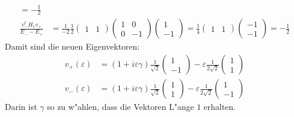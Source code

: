 \begin{loesung}
\begin{align*}
=
-\frac12
\\
\frac{v_-^tH_1v_+}{E_--E_+}
&=
\frac{1}{-2}
\frac12
	\begin{pmatrix}1&1\end{pmatrix}
	\begin{pmatrix}1&0\\0&-1\end{pmatrix}
	\begin{pmatrix}1\\-1\end{pmatrix}
=
\frac14
	\begin{pmatrix}1&1\end{pmatrix}
	\begin{pmatrix}-1\\-1\end{pmatrix}
=
-\frac12
\end{align*}
Damit sind die neuen Eigenvektoren:
\begin{align*}
v_+(\varepsilon)
&=
(1+i\varepsilon\gamma)
\frac1{\sqrt{2}}
\begin{pmatrix}1\\-1\end{pmatrix}
-\varepsilon\frac1{2\sqrt{2}}\begin{pmatrix}1\\1\end{pmatrix}
\\
v_-(\varepsilon)
&=
(1+i\varepsilon\gamma)
\frac1{\sqrt{2}}
\begin{pmatrix}1\\1\end{pmatrix}
-\varepsilon\frac1{2\sqrt{2}}\begin{pmatrix}1\\-1\end{pmatrix}
\end{align*}
Darin ist $\gamma$ so zu w"ahlen, dass die Vektoren L"ange $1$ erhalten.
\end{loesung}

